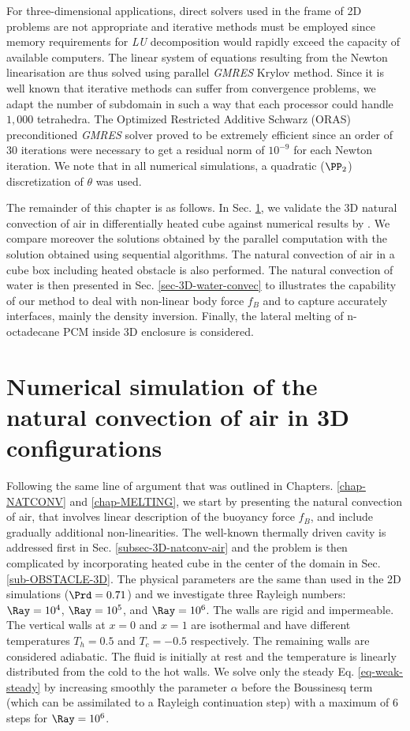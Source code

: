 For three-dimensional applications, direct solvers used in the frame of 2D problems are not appropriate and iterative methods must be employed since memory requirements for \textit{LU} decomposition would rapidly exceed the capacity of available computers.
The linear system of equations resulting from the Newton linearisation are thus solved using parallel \textit{GMRES} Krylov method.
Since it is well known that iterative methods can suffer from convergence problems, we adapt the number of subdomain in such a way that each processor could handle $1,000$ tetrahedra.
The Optimized Restricted Additive Schwarz (ORAS) preconditioned \textit{GMRES} solver proved to be extremely efficient since an order of 30 iterations were necessary to get a residual norm of $10^{-9}$ for each Newton iteration.
We note that in all numerical simulations, a quadratic ($\PP_2$) discretization of $\theta$ was used.

The remainder of this chapter is as follows.
In Sec. \ref{sec: natconv-air-3D}, we validate the 3D natural convection of air in differentially heated cube against numerical results by \cite{Wakashima-2004}.
We compare moreover the solutions obtained by the parallel computation with the solution obtained using sequential algorithms.
The natural convection of air in a cube box including heated obstacle is also performed.
The natural convection of water is then presented in Sec. \ref{sec-3D-water-convec} to illustrates the capability of our method to deal with non-linear body force $f_B$ and to capture accurately interfaces, mainly the density inversion.
Finally, the lateral melting of n-octadecane PCM inside 3D enclosure is considered.

\section{Numerical simulation of the natural convection of air in 3D configurations}\label{sec: natconv-air-3D}
 Following the same line of argument that was outlined in Chapters. \ref{chap-NATCONV} and \ref{chap-MELTING}, we start by presenting the natural convection of air, that involves linear description of the buoyancy force $f_B$, and include gradually additional non-linearities.
The well-known thermally driven cavity is addressed first in Sec. \ref{subsec-3D-natconv-air} and the problem is then complicated by incorporating heated cube in the center of the domain in Sec. \ref{sub-OBSTACLE-3D}.
The physical parameters are the same than used in the 2D simulations ($\Prd = 0.71$) and we investigate three Rayleigh numbers: $\Ray=10^4$, $\Ray=10^5$, and $\Ray=10^6$. 
The walls are rigid and impermeable. The vertical walls at $x=0$ and $x=1$ are isothermal and have different temperatures $T_h=0.5$ and $T_c=-0.5$ respectively. The remaining walls are considered adiabatic. 
The fluid is initially at rest and the temperature is linearly distributed from the cold to the hot walls.
We solve only the steady Eq. \ref{eq-weak-steady} by increasing smoothly the parameter $\alpha$ before the Boussinesq term (which can be assimilated to a Rayleigh continuation step) with a maximum of $6$ steps for $\Ray = 10^6$.

